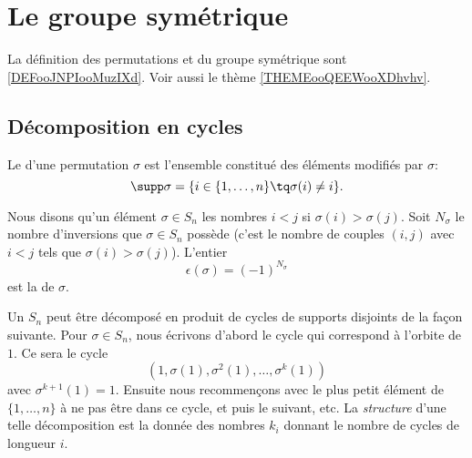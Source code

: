 \section{Le groupe symétrique}

La définition des permutations et du groupe symétrique sont \ref{DEFooJNPIooMuzIXd}. Voir aussi le thème \ref{THEMEooQEEWooXDhvhv}.

\subsection{Décomposition en cycles}

\begin{definition}      \label{DEFooSupportPermutation}
    Le  d'une permutation $\sigma$ est l'ensemble constitué des éléments modifiés par $\sigma$:
    \begin{equation*}
        \supp \sigma = \{ i \in \{1,\ldots,n \} \tq \sigma(i) \neq i\}.
    \end{equation*}
\end{definition}

\begin{definition}  \label{DEFooWPYSooPWuwWO}
    Nous disons qu'un élément \( \sigma \in S_n\)  les nombres \( i<j\) si \( \sigma(i)>\sigma(j)\). Soit \( N_\sigma\) le nombre d'inversions que \( \sigma\in S_n\) possède (c'est le nombre de couples \( (i,j)\) avec \( i<j\) tels que \( \sigma(i)>\sigma(j)\)). L'entier
    \begin{equation}
        \epsilon(\sigma)=(-1)^{N_\sigma}
    \end{equation}
    est la  de \( \sigma\).
\end{definition}

Un  \( S_n\) peut être décomposé en produit de cycles de supports disjoints de la façon suivante. Pour \( \sigma \in S_n \), nous écrivons d'abord le cycle qui correspond à l'orbite de \( 1\). Ce sera le cycle
\begin{equation}
    (1,\sigma(1),\sigma^2(1),\ldots, \sigma^k(1))
\end{equation}
avec \( \sigma^{k+1}(1)=1\). Ensuite nous recommençons avec le plus petit élément de \( \{ 1,\ldots, n \}\) à ne pas être dans ce cycle, et puis le suivant, etc. La \emph{structure} d'une telle décomposition est la donnée des nombres \( k_i\) donnant le nombre de cycles de longueur \( i\).

